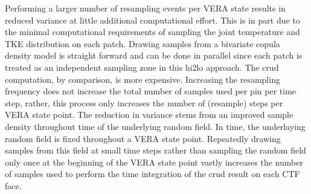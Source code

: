 Performing a larger number of resampling events per VERA state results in reduced variance at little additional computational effort.
This is in part due to the minimal computational requirements of sampling the joint temperature and TKE distribution on each patch.  Drawing samples from a bivariate copula density model is straight forward and can be done in parallel since each patch is treated as an independent sampling zone in this hi2lo approach.  The crud computation, by comparison, is more expensive.  Increasing the resampling frequency does not increase the total number of samples used per pin per time step, rather, this process only increases the number of (resample) steps per VERA state point.  The reduction in variance stems from an improved sample density throughout time of the underlying random field.  In time, the underlaying random field is fixed throughout a VERA state point.  Repeatedly drawing samples from this field at small time steps rather than sampling the random field only once at the beginning of the VERA state point vastly increases the number of samples used to perform the time integration of the crud result on each CTF face.


